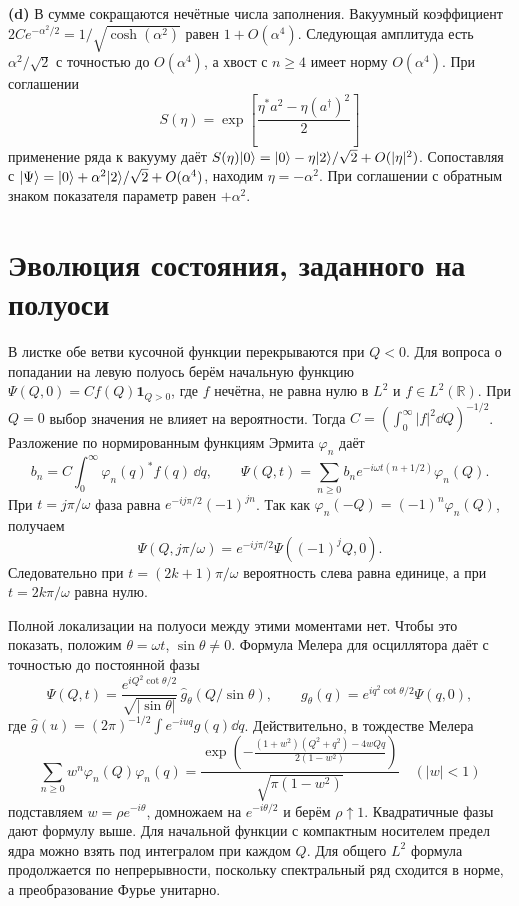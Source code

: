 \documentclass[11pt,a4paper]{article}
\begin{document}
\textbf{(d)} В сумме сокращаются нечётные числа заполнения.
Вакуумный коэффициент \(2C e^{-\alpha^2/2}=1/\sqrt{\cosh(\alpha^2)}\)
равен \(1+O(\alpha^4)\). Следующая амплитуда есть
\(\alpha^2/\sqrt2\) с точностью до \(O(\alpha^4)\), а хвост
с \(n\ge4\) имеет норму \(O(\alpha^4)\).
При соглашении
\[
 S(\eta)=\exp\!\left[\frac{\eta^*a^2-\eta(a^\dagger)^2}{2}\right]
\]
применение ряда к вакууму даёт
\(S(\eta)\lvert 0\rangle=\lvert 0\rangle-\eta\lvert 2\rangle/\sqrt2+O(|\eta|^2)\).
Сопоставляя с \(\lvert \Psi\rangle=\lvert 0\rangle+\alpha^2\lvert 2\rangle/\sqrt2+O(\alpha^4)\),
находим \(\eta=-\alpha^2\). При соглашении с обратным знаком
показателя параметр равен \(+\alpha^2\).

\section{Эволюция состояния, заданного на полуоси}

В листке обе ветви кусочной функции перекрываются при \(Q<0\).
Для вопроса о попадании на левую полуось берём начальную функцию
\(\Psi(Q,0)=C f(Q)\mathbf1_{Q>0}\), где \(f\) нечётна,
не равна нулю в \(L^2\) и \(f\in L^2(\mathbb R)\).
При \(Q=0\) выбор значения не влияет на вероятности.
Тогда \(C=(\int_0^\infty |f|^2\dd Q)^{-1/2}\).
Разложение по нормированным функциям Эрмита \(\varphi_n\) даёт
\[
 b_n=C\int_0^\infty \varphi_n(q)^* f(q)\,\dd q,\qquad
 \Psi(Q,t)=\sum_{n\ge0}b_n e^{-i\omega t(n+1/2)}\varphi_n(Q).
\]
При \(t=j\pi/\omega\) фаза равна \(e^{-ij\pi/2}(-1)^{jn}\).
Так как \(\varphi_n(-Q)=(-1)^n\varphi_n(Q)\), получаем
\[
 \Psi(Q,j\pi/\omega)=e^{-ij\pi/2}\Psi((-1)^j Q,0).
\]
Следовательно при \(t=(2k+1)\pi/\omega\) вероятность
слева равна единице, а при \(t=2k\pi/\omega\) равна нулю.

Полной локализации на полуоси между этими моментами нет.
Чтобы это показать, положим \(\theta=\omega t\), \(\sin\theta\ne0\).
Формула Мелера для осциллятора даёт с точностью до постоянной
фазы
\[
 \Psi(Q,t)=\frac{e^{i Q^2\cot\theta/2}}{\sqrt{|\sin\theta|}}\,
 \widehat g_\theta(Q/\sin\theta),\qquad
 g_\theta(q)=e^{iq^2\cot\theta/2}\Psi(q,0),
\]
где \(\widehat g(u)=(2\pi)^{-1/2}\int e^{-iuq}g(q)\dd q\).
Действительно, в тождестве Мелера
\[
 \sum_{n\ge0}w^n\varphi_n(Q)\varphi_n(q)
 =\frac{\exp\!\left(
 -\frac{(1+w^2)(Q^2+q^2)-4wQq}{2(1-w^2)}
                    \right)}{\sqrt{\pi(1-w^2)}}\quad (|w|<1)
\]
подставляем \(w=\rho e^{-i\theta}\), домножаем на \(e^{-i\theta/2}\)
и берём \(\rho\uparrow1\). Квадратичные фазы дают формулу выше.
Для начальной функции с компактным носителем предел ядра
можно взять под интегралом при каждом \(Q\). Для общего \(L^2\)
формула продолжается по непрерывности, поскольку спектральный
ряд сходится в норме, а преобразование Фурье унитарно.
\end{document}
